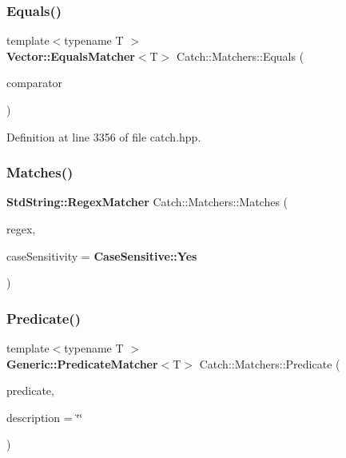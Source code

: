 \mbox{\label{namespace_catch_1_1_matchers_a332a401fb0da33c988e9cfa400ecce1b}} 
\subsubsection{Equals()\hspace{0.1cm}{\footnotesize\ttfamily [2/2]}}
{\footnotesize\ttfamily template$<$typename T $>$ \\
\textbf{ Vector\+::\+Equals\+Matcher}$<$T$>$ Catch\+::\+Matchers\+::\+Equals (\begin{DoxyParamCaption}\item[{std\+::vector$<$ T $>$ const \&}]{comparator }\end{DoxyParamCaption})}



Definition at line 3356 of file catch.\+hpp.

\mbox{\label{namespace_catch_1_1_matchers_a82f1893cf50ae4c14b9b3e0980bf22b8}} 
\subsubsection{Matches()}
{\footnotesize\ttfamily \textbf{ Std\+String\+::\+Regex\+Matcher} Catch\+::\+Matchers\+::\+Matches (\begin{DoxyParamCaption}\item[{std\+::string const \&}]{regex,  }\item[{\textbf{ Case\+Sensitive\+::\+Choice}}]{case\+Sensitivity = {\ttfamily \textbf{ Case\+Sensitive\+::\+Yes}} }\end{DoxyParamCaption})}

\mbox{\label{namespace_catch_1_1_matchers_a034f2de6c0aac6f4a662fdf2558aedce}} 
\subsubsection{Predicate()}
{\footnotesize\ttfamily template$<$typename T $>$ \\
\textbf{ Generic\+::\+Predicate\+Matcher}$<$T$>$ Catch\+::\+Matchers\+::\+Predicate (\begin{DoxyParamCaption}\item[{std\+::function$<$ bool(T const \&)$>$ const \&}]{predicate,  }\item[{std\+::string const \&}]{description = {\ttfamily \char`\"{}\char`\"{}} }\end{DoxyParamCaption})}



